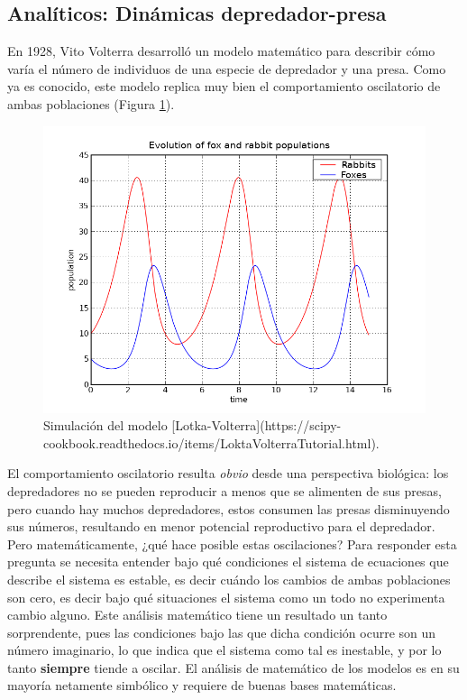 \documentclass[
]{book}
\begin{document}
\hypertarget{analuxedticos-dinuxe1micas-depredador-presa}{%
\subsection{Analíticos: Dinámicas depredador-presa}\label{analuxedticos-dinuxe1micas-depredador-presa}}

En 1928, Vito Volterra \citep{volterra1928variations} desarrolló un modelo matemático para describir cómo varía el número de individuos de una especie de depredador y una presa. Como ya es conocido, este modelo replica muy bien el comportamiento oscilatorio de ambas poblaciones (Figura \ref{fig:volterra}).

\begin{figure}

{\centering \includegraphics[width=11.11in]{Unidad-I/volterra} 

}

\caption{Simulación del modelo [Lotka-Volterra](https://scipy-cookbook.readthedocs.io/items/LoktaVolterraTutorial.html).}\label{fig:volterra}
\end{figure}

El comportamiento oscilatorio resulta \emph{obvio} desde una perspectiva biológica: los depredadores no se pueden reproducir a menos que se alimenten de sus presas, pero cuando hay muchos depredadores, estos consumen las presas disminuyendo sus números, resultando en menor potencial reproductivo para el depredador. Pero matemáticamente, ¿qué hace posible estas oscilaciones? Para responder esta pregunta se necesita entender bajo qué condiciones el sistema de ecuaciones que describe el sistema es estable, es decir cuándo los cambios de ambas poblaciones son cero, es decir bajo qué situaciones el sistema como un todo no experimenta cambio alguno. Este análisis matemático tiene un resultado un tanto sorprendente, pues las condiciones bajo las que dicha condición ocurre son un número imaginario, lo que indica que el sistema como tal es inestable, y por lo tanto \textbf{siempre} tiende a oscilar. El análisis de matemático de los modelos es en su mayoría netamente simbólico y requiere de buenas bases matemáticas.
\end{document}
